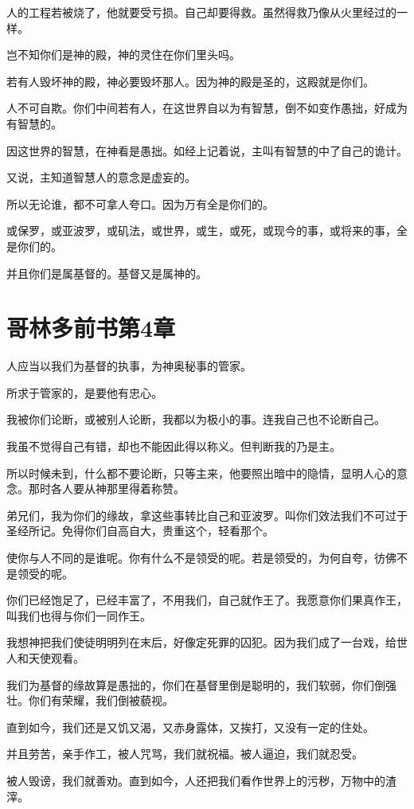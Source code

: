 \documentclass[12pt,oneside]{book}
\begin{document}
人的工程若被烧了，他就要受亏损。自己却要得救。虽然得救乃像从火里经过的一样。

岂不知你们是神的殿，神的灵住在你们里头吗。

若有人毁坏神的殿，神必要毁坏那人。因为神的殿是圣的，这殿就是你们。

人不可自欺。你们中间若有人，在这世界自以为有智慧，倒不如变作愚拙，好成为有智慧的。

因这世界的智慧，在神看是愚拙。如经上记着说，主叫有智慧的中了自己的诡计。

又说，主知道智慧人的意念是虚妄的。

所以无论谁，都不可拿人夸口。因为万有全是你们的。

或保罗，或亚波罗，或矶法，或世界，或生，或死，或现今的事，或将来的事，全是你们的。

并且你们是属基督的。基督又是属神的。

\chapter{哥林多前书第4章}
人应当以我们为基督的执事，为神奥秘事的管家。

所求于管家的，是要他有忠心。

我被你们论断，或被别人论断，我都以为极小的事。连我自己也不论断自己。

我虽不觉得自己有错，却也不能因此得以称义。但判断我的乃是主。

所以时候未到，什么都不要论断，只等主来，他要照出暗中的隐情，显明人心的意念。那时各人要从神那里得着称赞。

弟兄们，我为你们的缘故，拿这些事转比自己和亚波罗。叫你们效法我们不可过于圣经所记。免得你们自高自大，贵重这个，轻看那个。

使你与人不同的是谁呢。你有什么不是领受的呢。若是领受的，为何自夸，彷佛不是领受的呢。

你们已经饱足了，已经丰富了，不用我们，自己就作王了。我愿意你们果真作王，叫我们也得与你们一同作王。

我想神把我们使徒明明列在末后，好像定死罪的囚犯。因为我们成了一台戏，给世人和天使观看。

我们为基督的缘故算是愚拙的，你们在基督里倒是聪明的，我们软弱，你们倒强壮。你们有荣耀，我们倒被藐视。

直到如今，我们还是又饥又渴，又赤身露体，又挨打，又没有一定的住处。

并且劳苦，亲手作工，被人咒骂，我们就祝福。被人逼迫，我们就忍受。

被人毁谤，我们就善劝。直到如今，人还把我们看作世界上的污秽，万物中的渣滓。
\end{document}
